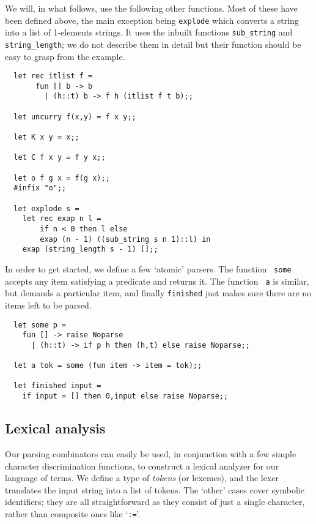 We will, in what follows, use the following other functions. Most of these
have been defined above, the main exception being {\tt explode} which converts
a string into a list of 1-elements strings. It uses the inbuilt functions
{\verb!sub_string!} and {\verb!string_length!}; we do not describe them in
detail but their function should be easy to grasp from the example.

\begin{boxed}\begin{verbatim}
  let rec itlist f =
       fun [] b -> b
         | (h::t) b -> f h (itlist f t b);;

  let uncurry f(x,y) = f x y;;

  let K x y = x;;

  let C f x y = f y x;;

  let o f g x = f(g x);;
  #infix "o";;

  let explode s =
    let rec exap n l =
        if n < 0 then l else
        exap (n - 1) ((sub_string s n 1)::l) in
    exap (string_length s - 1) [];;
\end{verbatim}\end{boxed}

In order to get started, we define a few `atomic' parsers. The function {\tt
some} accepts any item satisfying a predicate and returns it. The function {\tt
a} is similar, but demands a particular item, and finally {\tt finished} just
makes sure there are no items left to be parsed.

\begin{boxed}\begin{lstlisting}
  let some p =
    fun [] -> raise Noparse
      | (h::t) -> if p h then (h,t) else raise Noparse;;

  let a tok = some (fun item -> item = tok);;

  let finished input =
    if input = [] then 0,input else raise Noparse;;
\end{lstlisting}\end{boxed}

\subsection{Lexical analysis}

Our parsing combinators can easily be used, in conjunction with a few simple
character discrimination functions, to construct a lexical analyzer for our
language of terms. We define a type of {\em tokens} (or lexemes), and the lexer
translates the input string into a list of tokens. The `other' cases cover
symbolic identifiers; they are all straightforward as they consist of just a
single character, rather than composite ones like `{\verb!:=!}'.

